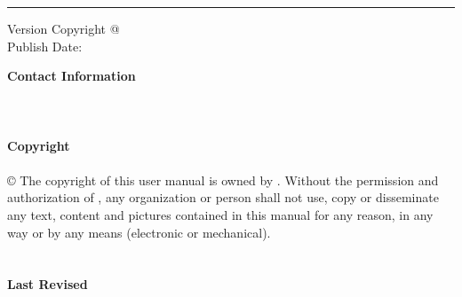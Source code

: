 
%
\begin{titlepage}
	\flushright
	\hfill
	\vfill
	{\LARGE\thesisTitle \par}
    \rule[5pt]{\textwidth}{.4pt} \par
    Version \thesisVersion
    \vfill
    Copyright @  \\
	Publish Date: \textit{\large\thesisDate} \\
	
\end{titlepage}

{
    
    \large\textbf{Contact Information} \\
    \sixsnow\sixsnow\sixsnow\sixsnow\sixsnow\sixsnow\sixsnow\sixsnow\sixsnow\\
    \\
    \\
    \large \textbf{Copyright} \\
    \sixsnow\sixsnow\sixsnow\sixsnow\sixsnow\sixsnow\sixsnow\sixsnow\sixsnow\\
    © The copyright of this user manual is owned by \sixsnow\sixsnow\sixsnow\sixsnow\sixsnow\sixsnow\sixsnow. Without the permission and authorization of \sixsnow\sixsnow\sixsnow\sixsnow\sixsnow\sixsnow\sixsnow\sixsnow\sixsnow\sixsnow\sixsnow\sixsnow\sixsnow , 
    any organization or person shall not use, copy or disseminate any text, content and pictures contained in this manual for any reason, 
    in any way or by any means (electronic or mechanical).\\
    \\
    \\
	\large \textbf{Last Revised} \\
	\thesisDate \\
}

